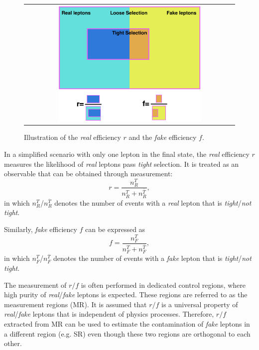  \begin{figure}[tbh!]
 \begin{center}
 \begin{tabular}{c}
 \includegraphics[width=0.7\textwidth]{figures/Part3/Nonprompt/matrix}
 \end{tabular}
 \caption{Illustration of the \emph{real} efficiency $r$ and the \emph{fake} efficiency $f$.}
 \label{fig:Matrix_Method}
 \end{center}
\end{figure}

In a simplified scenario with only one lepton in the final state, the \emph{real} efficiency $r$ measures the likelihood of \emph{real} leptons pass \emph{tight} selection. It is treated as an observable that can be obtained through measurement:
\begin{equation}
r=\frac{n_R^{T}}{n_R^{T}+n_R^{\overline{T}}},
 \label{eq:real_rate}
\end{equation}
in which $n_R^{T}$/$n_R^{\overline{T}}$ denotes the number of events with a \emph{real} lepton that is \emph{tight}/\emph{not tight}.

Similarly, \emph{fake} efficiency $f$ can be expressed as
\begin{equation}
f=\frac{n_F^{T}}{n_F^{T}+n_F^{\overline{T}}},
 \label{eq:fake_rate}
\end{equation}
in which $n_F^{T}$/$n_F^{\overline{T}}$ denotes the number of events with a \emph{fake} lepton that is \emph{tight}/\emph{not tight}.

The measurement of $r/f$ is often performed in dedicated control regions, where high purity of \emph{real}/\emph{fake} leptons is expected. These regions are referred to as the measurement regions (MR). It is assumed that $r/f$ is a universal property of \emph{real}/\emph{fake} leptons that is independent of physics processes. Therefore, $r/f$ extracted from MR can be used to estimate the contamination of \emph{fake} leptons in a different region (e.g. SR) even though these two regions are orthogonal to each other.

